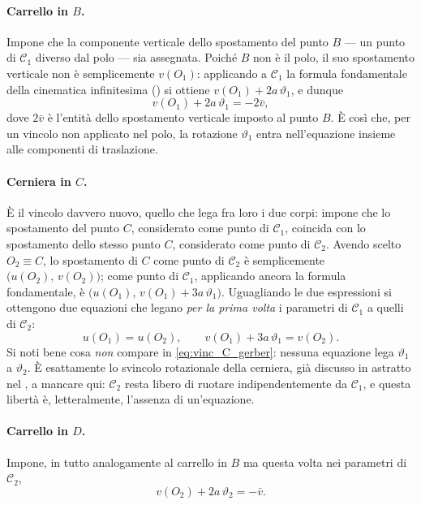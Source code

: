 \paragraph{Carrello in $B$.} Impone che la componente verticale dello
spostamento del punto $B$ --- un punto di $\mathcal{C}_1$ diverso dal
polo --- sia assegnata. Poiché $B$ non è il polo, il suo spostamento
verticale non è semplicemente $v(O_1)$: applicando a $\mathcal{C}_1$ la
formula fondamentale della cinematica infinitesima
() si ottiene $v(O_1)+2a\,\vartheta_1$, e
dunque
\begin{equation}\label{eq:vinc_B_gerber}
	v(O_1) + 2a\,\vartheta_1 =- 2\bar{v},
\end{equation}
dove $2\bar{v}$ è l'entità dello spostamento verticale imposto al punto $B$.
È così che, per un vincolo non applicato nel polo, la rotazione
$\vartheta_1$ entra nell'equazione insieme alle componenti di
traslazione.

\paragraph{Cerniera in $C$.} È il vincolo davvero nuovo, quello che lega
fra loro i due corpi: impone che lo spostamento del punto $C$, considerato
come punto di $\mathcal{C}_1$, coincida con lo spostamento dello stesso
punto $C$, considerato come punto di $\mathcal{C}_2$. Avendo scelto
$O_2\equiv C$, lo spostamento di $C$ come punto di $\mathcal{C}_2$ è
semplicemente $\bigl(u(O_2),\,v(O_2)\bigr)$; come punto di
$\mathcal{C}_1$, applicando ancora la formula fondamentale, è
$\bigl(u(O_1),\,v(O_1)+3a\,\vartheta_1\bigr)$. Uguagliando le due
espressioni si ottengono due equazioni che legano \emph{per la prima
	volta} i parametri di $\mathcal{C}_1$ a quelli di $\mathcal{C}_2$:
\begin{equation}\label{eq:vinc_C_gerber}
	u(O_1) = u(O_2), \qquad
	v(O_1) + 3a\,\vartheta_1 = v(O_2).
\end{equation}
Si noti bene cosa \emph{non} compare in \eqref{eq:vinc_C_gerber}:
nessuna equazione lega $\vartheta_1$ a $\vartheta_2$. È esattamente lo
svincolo rotazionale della cerniera, già discusso in astratto nel
, a mancare qui: $\mathcal{C}_2$ resta libero
di ruotare indipendentemente da $\mathcal{C}_1$, e questa libertà è,
letteralmente, l'assenza di un'equazione.

\paragraph{Carrello in $D$.} Impone, in tutto analogamente al carrello
in $B$ ma questa volta nei parametri di $\mathcal{C}_2$,
\begin{equation}\label{eq:vinc_D_gerber}
	v(O_2) + 2a\,\vartheta_2 =- \bar{v}.
\end{equation}

